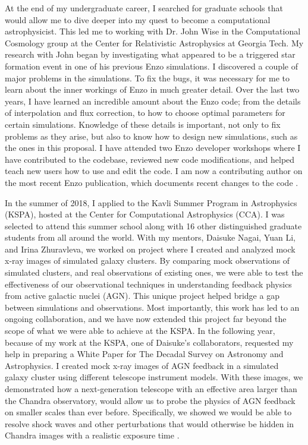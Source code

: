 \documentclass[letterpaper, 12pt]{article}
\begin{document}
At the end of my undergraduate career, I searched for graduate schools that would allow me to dive deeper into my quest to become a computational astrophysicist. This led me to working with Dr. John Wise in the Computational Cosmology group at the Center for Relativistic Astrophysics at Georgia Tech. My research with John began by investigating what appeared to be a triggered star formation event in one of his previous Enzo simulations. I discovered a couple of major problems in the simulations. To fix the bugs, it was necessary for me to learn about the inner workings of Enzo in much greater detail. Over the last two years, I have learned an incredible amount about the Enzo code; from the details of interpolation and flux correction, to how to choose optimal parameters for certain simulations. Knowledge of these details is important, not only to fix problems as they arise, but also to know how to design new simulations, such as the ones in this proposal. I have attended two Enzo developer workshops where I have contributed to the codebase, reviewed new code modifications, and helped teach new users how to use and edit the code. I am now a contributing author on the most recent Enzo publication, which documents recent changes to the code \citep{ENZO2019_JOSS}.

In the summer of 2018, I applied to the Kavli Summer Program in Astrophysics (KSPA), hosted at the Center for Computational Astrophysics (CCA). I was selected to attend this summer school along with 16 other distinguished graduate students from all around the world. With my mentors, Daisuke Nagai, Yuan Li, and Irina Zhuravleva, we worked on project where I created and analyzed mock x-ray images of simulated galaxy clusters. By comparing mock observations of simulated clusters, and real observations of existing ones, we were able to test the effectiveness of our observational techniques in understanding feedback physics from active galactic nuclei (AGN). This unique project helped bridge a gap between simulations and observations. Most importantly, this work has led to an ongoing collaboration, and we have now extended this project far beyond the scope of what we were able to achieve at the KSPA.
In the following year, because of my work at the KSPA, one of Daisuke’s collaborators, requested my help in preparing a White Paper for The Decadal Survey on Astronomy and Astrophysics. I created mock x-ray images of AGN feedback in a simulated galaxy cluster using different telescope instrument models. With these images, we demonstrated how a next-generation telescope with an effective area larger than the Chandra observatory, would allow us to probe the physics of AGN feedback on smaller scales than ever before. Specifically, we showed we would be able to resolve shock waves and other perturbations that would otherwise be hidden in Chandra images with a realistic exposure time \citep{WP_Ruszkowski2019}. 
\end{document}
